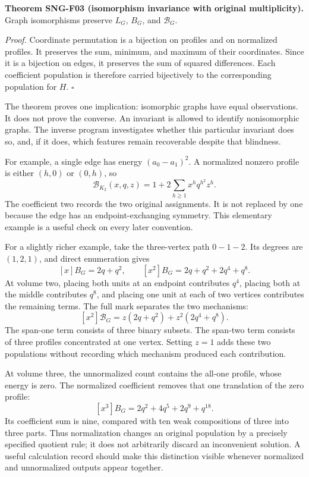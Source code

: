 \documentclass[
  11pt,
  a4paper,
]{report}
\begin{document}
\textbf{Theorem SNG-F03 (isomorphism invariance with original
multiplicity).} Graph isomorphisms preserve \(L_G\), \(B_G\), and
\(\mathcal B_G\).

\emph{Proof.} Coordinate permutation is a bijection on profiles and on
normalized profiles. It preserves the sum, minimum, and maximum of their
coordinates. Since it is a bijection on edges, it preserves the sum of
squared differences. Each coefficient population is therefore carried
bijectively to the corresponding population for \(H\). \(\square\)

The theorem proves one implication: isomorphic graphs have equal
observations. It does not prove the converse. An invariant is allowed to
identify nonisomorphic graphs. The inverse program investigates whether
this particular invariant does so, and, if it does, which features
remain recoverable despite that blindness.

For example, a single edge has energy \((a_0-a_1)^2\). A normalized
nonzero profile is either \((h,0)\) or \((0,h)\), so \[
\mathcal B_{K_2}(x,q,z)=1+2\sum_{h\ge1}x^h q^{h^2}z^h.
\] The coefficient two records the two original assignments. It is not
replaced by one because the edge has an endpoint-exchanging symmetry.
This elementary example is a useful check on every later convention.

For a slightly richer example, take the three-vertex path \(0-1-2\). Its
degrees are \((1,2,1)\), and direct enumeration gives \[
[x]B_G=2q+q^2,
\qquad
[x^2]B_G=2q+q^2+2q^4+q^8.
\] At volume two, placing both units at an endpoint contributes \(q^4\),
placing both at the middle contributes \(q^8\), and placing one unit at
each of two vertices contributes the remaining terms. The full mark
separates the two mechanisms: \[
[x^2]\mathcal B_G
=z(2q+q^2)+z^2(2q^4+q^8).
\] The span-one term consists of three binary subsets. The span-two term
consists of three profiles concentrated at one vertex. Setting \(z=1\)
adds these two populations without recording which mechanism produced
each contribution.

At volume three, the unnormalized count contains the all-one profile,
whose energy is zero. The normalized coefficient removes that one
translation of the zero profile: \[
[x^3]B_G=2q^2+4q^5+2q^9+q^{18}.
\] Its coefficient sum is nine, compared with ten weak compositions of
three into three parts. Thus normalization changes an original
population by a precisely specified quotient rule; it does not
arbitrarily discard an inconvenient solution. A useful calculation
record should make this distinction visible whenever normalized and
unnormalized outputs appear together.
\end{document}
